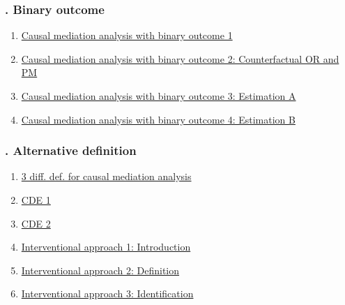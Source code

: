 \documentclass[11pt]{article}
\begin{document}
\vspace{-1cm}

\subsubsection*{. Binary outcome}

\vspace{-0.5cm}

\begin{enumerate}
	\item \href{https://mp.weixin.qq.com/s/Ik32rRrlkNIB-AlhBy6NZQ}{Causal mediation analysis with binary outcome 1}	%
	\item \href{https://mp.weixin.qq.com/s/niCB01OT_NscVGvP6I_Fvw}{Causal mediation analysis with binary outcome 2: Counterfactual OR and PM}	%
	\item \href{https://mp.weixin.qq.com/s/yQg9Vr9YinbQCZW_8fVwxQ}{Causal mediation analysis with binary outcome 3: Estimation A}	%
	\item \href{https://mp.weixin.qq.com/s/oniTcLXzqKiho7i3uDsv0A}{Causal mediation analysis with binary outcome 4: Estimation B}	%
\end{enumerate}

\vspace{-1cm}

\subsubsection*{. Alternative definition}

\vspace{-0.5cm}

\begin{multicols}{2}
	\begin{enumerate}
		\item \href{https://mp.weixin.qq.com/s/ULs-LgvmoyZg9Q00kLoOcQ}{3 diff. def. for causal mediation analysis}	%
		\item \href{https://mp.weixin.qq.com/s/pti3oszhsNJY6r5aZOUYhA}{CDE 1}	%
		\item \href{https://mp.weixin.qq.com/s/xLrNXJFeMtjvd3Wnivc06g}{CDE 2}	%
		\item \href{https://mp.weixin.qq.com/s/vEsX4FY3R-y-8ulHakQifw}{Interventional approach 1: Introduction}	%
		\item \href{https://mp.weixin.qq.com/s/qUxU9v45u5qgJ9WWlkY2JA}{Interventional approach 2: Definition}	%
		\item \href{https://mp.weixin.qq.com/s/nj-NmXpdj8qhT03ect3F2w}{Interventional approach 3: Identification}	%
	\end{enumerate}
\end{multicols}
\end{document}
